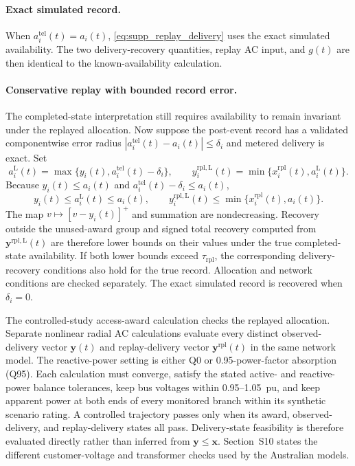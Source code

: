 \documentclass[11pt]{article}
\begin{document}
\paragraph{Exact simulated record.}
When $a_i^{\mathrm{tel}}(t)=a_i(t)$,
\eqref{eq:supp_replay_delivery} uses the exact simulated availability. The two
delivery-recovery quantities, replay AC input, and $g(t)$ are then identical to
the known-availability calculation.

\paragraph{Conservative replay with bounded record error.}
The completed-state interpretation still requires availability to remain
invariant under the replayed allocation. Now suppose the post-event record has a
validated componentwise error radius
$|a_i^{\mathrm{tel}}(t)-a_i(t)|\le\delta_i$ and metered delivery is exact. Set
\begin{equation}
a_i^{\mathrm{L}}(t)=\max\{y_i(t),a_i^{\mathrm{tel}}(t)-\delta_i\},
\qquad
y_i^{\mathrm{rpl,L}}(t)=
\min\{x_i^{\mathrm{rpl}}(t),a_i^{\mathrm{L}}(t)\}.
\label{eq:supp_robust_replay_lower_bound}
\end{equation}
Because $y_i(t)\le a_i(t)$ and
$a_i^{\mathrm{tel}}(t)-\delta_i\le a_i(t)$,
\begin{equation}
y_i(t)\le a_i^{\mathrm{L}}(t)\le a_i(t),
\qquad
y_i^{\mathrm{rpl,L}}(t)\le
\min\{x_i^{\mathrm{rpl}}(t),a_i(t)\}.
\label{eq:supp_robust_replay_order}
\end{equation}
The map $v\mapsto[v-y_i(t)]^+$ and summation are nondecreasing. Recovery outside
the unused-award group and signed total recovery computed from
$\mathbf y^{\mathrm{rpl,L}}(t)$ are therefore lower bounds on their values under
the true completed-state availability. If both lower bounds exceed
$\tau_{\mathrm{rpl}}$, the corresponding delivery-recovery conditions also hold
for the true record. Allocation and network conditions are checked separately.
The exact simulated record is recovered when $\delta_i=0$.

The controlled-study access-award calculation checks the replayed allocation.
Separate nonlinear radial AC calculations evaluate every distinct
observed-delivery vector $\mathbf y(t)$ and replay-delivery vector
$\mathbf y^{\mathrm{rpl}}(t)$ in the same network model. The reactive-power
setting is either Q0 or 0.95-power-factor absorption (Q95). Each calculation
must converge, satisfy the stated active- and reactive-power balance tolerances,
keep bus voltages within 0.95--1.05~pu, and keep apparent power at both ends of
every monitored branch within its synthetic scenario rating. A controlled
trajectory passes only when its award, observed-delivery, and replay-delivery
states all pass. Delivery-state feasibility is therefore evaluated directly
rather than inferred from $\mathbf y\le\mathbf x$. Section~S10 states the
different customer-voltage and transformer checks used by the Australian
models.
\end{document}
